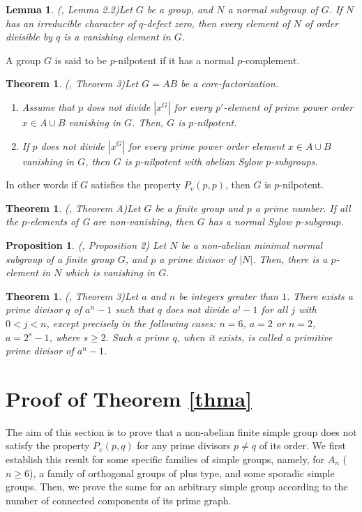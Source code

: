 \documentclass[11pt, a4paper]{article}
\numberwithin{equation}{section}
\theoremstyle{plain} %
\newtheorem{theorem}[defn]{Theorem}
\newtheorem{lemma}[theorem]{Lemma}
\newtheorem{prop}[defn]{Proposition}
\begin{document}
\begin{lemma}(\cite{MR3918622}, Lemma 2.2)\label{Brough_van} Let $G$ be a group, and $N$ a normal subgroup of $G$. If $N$ has an irreducible character of $q$-defect zero, then every element of $N$ of order divisible by $q$ is a vanishing element in $G$.
\end{lemma}

A group $G$ is said to be $p$-nilpotent if it has a normal $p$-complement.
\begin{theorem}(\cite{MR3918622}, Theorem 3)\label{Sotomayor_van} Let $G = AB$ be a core-factorization.
\begin{enumerate}
\item Assume that $p$ does not divide $|x^G|$ for every $p'$-element of prime power order
$x\in A\cup B$ vanishing in $G$. Then, $G$ is $p$-nilpotent. 
\item If $p$ does not divide $|x^G|$ for every prime power order element $x\in A\cup B$ vanishing in
$G$, then $G$ is $p$-nilpotent with abelian Sylow $p$-subgroups.
\end{enumerate}
\end{theorem}

In other words if $G$ satisfies the property $P_v(p,p)$, then $G$ is $p$-nilpotent.

\begin{theorem}(\cite{MR2469367}, Theorem A)\label{Thm_normal} Let $G$ be a finite group and $p$ a prime number. If all the $p$-elements of G are non-vanishing, then $G$ has a normal Sylow $p$-subgroup.
\end{theorem}
\begin{prop}(\cite{MR3918622}, Proposition 2) Let $N$ be a non-abelian minimal normal subgroup of a finite group $G$, and $p$ a prime divisor of $|N|$. Then, there is a $p$-element in $N$ which is vanishing in $G$.
\end{prop}



\begin{theorem}(\cite{MR1402885}, Theorem 3)\label{zsigmondy}
Let $a$ and $n$ be integers greater than $1$. There exists a prime divisor $q$ of $a^n-1$ such that $q$ does not divide $a^j-1$ for all $j$ with $0<j<n$, except precisely in the following cases: $n=6$, $a=2$ or 
$n=2$, $a=2^s-1$, where $s\geq 2$. 
Such a prime $q$, when it exists, is called a \textit{primitive prime divisor of $a^n-1$}.
\end{theorem}

\section{Proof of Theorem \ref{thma}}
The aim of this section is to prove that a non-abelian finite simple group does not satisfy the property $P_v(p,q)$ for any prime divisors $p\neq q$ of its order. We first establish this result for some specific families of simple groups, namely, for $A_n$ ($n\ge 6$), a family of orthogonal groups of plus type, and some sporadic simple groups. Then, we prove the same for an arbitrary simple group according to the number of connected components of its prime graph. 
\end{document}
